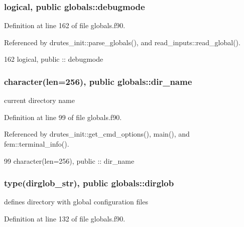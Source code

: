 \subsubsection[{debugmode}]{\setlength{\rightskip}{0pt plus 5cm}logical, public globals\+::debugmode}\label{namespaceglobals_aa071415dc7c18cea7a261a352314622c}


Definition at line 162 of file globals.\+f90.



Referenced by drutes\+\_\+init\+::parse\+\_\+globals(), and read\+\_\+inputs\+::read\+\_\+global().


\begin{DoxyCode}
162   \textcolor{keywordtype}{logical}, \textcolor{keywordtype}{public} :: debugmode
\end{DoxyCode}
\subsubsection[{dir\+\_\+name}]{\setlength{\rightskip}{0pt plus 5cm}character(len=256), public globals\+::dir\+\_\+name}\label{namespaceglobals_a7742ac7444be0d59ea2df1d66b8aa2ee}


current directory name 



Definition at line 99 of file globals.\+f90.



Referenced by drutes\+\_\+init\+::get\+\_\+cmd\+\_\+options(), main(), and fem\+::terminal\+\_\+info().


\begin{DoxyCode}
99   \textcolor{keywordtype}{character(len=256)}, \textcolor{keywordtype}{public} :: dir_name
\end{DoxyCode}
\subsubsection[{dirglob}]{\setlength{\rightskip}{0pt plus 5cm}type({\bf dirglob\+\_\+str}), public globals\+::dirglob}\label{namespaceglobals_a410a929a83ed0affdb292c261514f3c3}


defines directory with global configuration files 



Definition at line 132 of file globals.\+f90.



